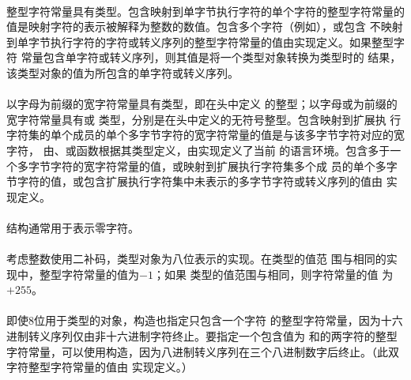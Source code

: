 {\semantic
\paragraph{}
整型字符常量具有类型。包含映射到单字节执行字符的单个字符的整型字符常量的
值是映射字符的表示被解释为整数的数值。包含多个字符（例如），或包含
不映射到单字节执行字符的字符或转义序列的整型字符常量的值由实现定义。如果整型字符
常量包含单字符或转义序列，则其值是将一个类型对象转换为类型时的
结果，该类型对象的值为所包含的单字符或转义序列。

\paragraph{}
以字母为前缀的宽字符常量具有类型，即在头中定义
的整型；以字母或为前缀的宽字符常量具有或
类型，分别是在头中定义的无符号整型。包含映射到扩展执
行字符集的单个成员的单个多字节字符的宽字符常量的值是与该多字节字符对应的宽字符，
由、或函数根据其类型定义，由实现定义了当前
的语言环境。包含多于一个多字节字符的宽字符常量的值，或映射到扩展执行字符集多个成
员的单个多字节字符的值，或包含扩展执行字符集中未表示的多字节字符或转义序列的值由
实现定义。

\paragraph{}
\ex 结构\tm{\sq\bs 0\sq}通常用于表示零字符。

\paragraph{}
\ex 考虑整数使用二补码，类型对象为八位表示的实现。在类型的值范
围与相同的实现中，整型字符常量的值为$-1$；如果
类型的值范围与相同，则字符常量的值
为$+255$。

\paragraph{}
\ex 即使8位用于类型的对象，构造也指定只包含一个字符
的整型字符常量，因为十六进制转义序列仅由非十六进制字符终止。要指定一个包含值为
和的两字符的整型字符常量，可以使用构造\tm{\sq\b
0223\sq}，因为八进制转义序列在三个八进制数字后终止。（此双字符整型字符常量的值由
实现定义。）

}
